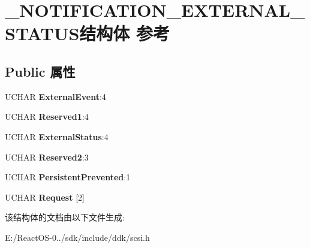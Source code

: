 \hypertarget{struct___n_o_t_i_f_i_c_a_t_i_o_n___e_x_t_e_r_n_a_l___s_t_a_t_u_s}{}\section{\+\_\+\+N\+O\+T\+I\+F\+I\+C\+A\+T\+I\+O\+N\+\_\+\+E\+X\+T\+E\+R\+N\+A\+L\+\_\+\+S\+T\+A\+T\+U\+S结构体 参考}
\label{struct___n_o_t_i_f_i_c_a_t_i_o_n___e_x_t_e_r_n_a_l___s_t_a_t_u_s}
\subsection*{Public 属性}
\begin{DoxyCompactItemize}
\item 
\mbox{\label{struct___n_o_t_i_f_i_c_a_t_i_o_n___e_x_t_e_r_n_a_l___s_t_a_t_u_s_a0efdbd95876222400ef816d7d85584a8}} 
U\+C\+H\+AR {\bfseries External\+Event}\+:4
\item 
\mbox{\label{struct___n_o_t_i_f_i_c_a_t_i_o_n___e_x_t_e_r_n_a_l___s_t_a_t_u_s_ac94f520012673c73f8066101eefa3e05}} 
U\+C\+H\+AR {\bfseries Reserved1}\+:4
\item 
\mbox{\label{struct___n_o_t_i_f_i_c_a_t_i_o_n___e_x_t_e_r_n_a_l___s_t_a_t_u_s_a048d7aae1180879214eff5ea1096fa5e}} 
U\+C\+H\+AR {\bfseries External\+Status}\+:4
\item 
\mbox{\label{struct___n_o_t_i_f_i_c_a_t_i_o_n___e_x_t_e_r_n_a_l___s_t_a_t_u_s_acda9f29addb9a7a17d9c66e4ce756ed7}} 
U\+C\+H\+AR {\bfseries Reserved2}\+:3
\item 
\mbox{\label{struct___n_o_t_i_f_i_c_a_t_i_o_n___e_x_t_e_r_n_a_l___s_t_a_t_u_s_a244becef932332cc85818aa6e107562d}} 
U\+C\+H\+AR {\bfseries Persistent\+Prevented}\+:1
\item 
\mbox{\label{struct___n_o_t_i_f_i_c_a_t_i_o_n___e_x_t_e_r_n_a_l___s_t_a_t_u_s_a12be02c17ef90e60eafd975ef0561498}} 
U\+C\+H\+AR {\bfseries Request} \mbox{[}2\mbox{]}
\end{DoxyCompactItemize}


该结构体的文档由以下文件生成\+:\begin{DoxyCompactItemize}
\item 
E\+:/\+React\+O\+S-\/0../sdk/include/ddk/scsi.\+h\end{DoxyCompactItemize}

